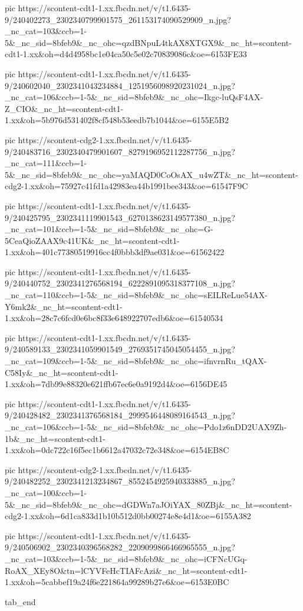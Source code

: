      pic https://scontent-cdt1-1.xx.fbcdn.net/v/t1.6435-9/240402273_2302340799901575_261153174090529909_n.jpg?_nc_cat=103&ccb=1-5&_nc_sid=8bfeb9&_nc_ohc=qzdBNpuL4tkAX8XTGX9&_nc_ht=scontent-cdt1-1.xx&oh=d4d4958bc1e04ca50c5e02c70839086c&oe=6153FE33

     pic https://scontent-cdt1-1.xx.fbcdn.net/v/t1.6435-9/240602040_2302341043234884_1251956098920231024_n.jpg?_nc_cat=106&ccb=1-5&_nc_sid=8bfeb9&_nc_ohc=Ikgc-luQsF4AX-Z_CIO&_nc_ht=scontent-cdt1-1.xx&oh=5b976d531402f8cf548b53eedb7b1044&oe=6155E5B2

     pic https://scontent-cdg2-1.xx.fbcdn.net/v/t1.6435-9/240483716_2302340479901607_8279196952112287756_n.jpg?_nc_cat=111&ccb=1-5&_nc_sid=8bfeb9&_nc_ohc=yaMAQD0CoOsAX_u4wZT&_nc_ht=scontent-cdg2-1.xx&oh=75927c41fd1a42983ea44b1991bee343&oe=61547F9C

     pic https://scontent-cdt1-1.xx.fbcdn.net/v/t1.6435-9/240425795_2302341119901543_6270138623149577380_n.jpg?_nc_cat=101&ccb=1-5&_nc_sid=8bfeb9&_nc_ohc=G-5CeaQioZAAX9c41UK&_nc_ht=scontent-cdt1-1.xx&oh=401c77380519916cc4f0bbb3df9ae031&oe=61562422

     pic https://scontent-cdt1-1.xx.fbcdn.net/v/t1.6435-9/240440752_2302341276568194_6222891095318377108_n.jpg?_nc_cat=110&ccb=1-5&_nc_sid=8bfeb9&_nc_ohc=sEILReLue54AX-Y6mk2&_nc_ht=scontent-cdt1-1.xx&oh=28c7c6fcd0e6bc8f33e648922707edb6&oe=61540534

     pic https://scontent-cdt1-1.xx.fbcdn.net/v/t1.6435-9/240589133_2302341059901549_2769351745045054455_n.jpg?_nc_cat=109&ccb=1-5&_nc_sid=8bfeb9&_nc_ohc=ifnvrnRu_tQAX-C58Iy&_nc_ht=scontent-cdt1-1.xx&oh=7db99e88320e621ffb67ec6e0a9192d4&oe=6156DE45

     pic https://scontent-cdt1-1.xx.fbcdn.net/v/t1.6435-9/240428482_2302341376568184_2999546448089164543_n.jpg?_nc_cat=106&ccb=1-5&_nc_sid=8bfeb9&_nc_ohc=Pdo1z6nDD2UAX9Zh-1b&_nc_ht=scontent-cdt1-1.xx&oh=0dc722c16f5ec1b6612a47032c72e348&oe=6154EB8C

     pic https://scontent-cdg2-1.xx.fbcdn.net/v/t1.6435-9/240482252_2302341213234867_8552454925940333885_n.jpg?_nc_cat=100&ccb=1-5&_nc_sid=8bfeb9&_nc_ohc=dGDWn7aJOiYAX_80ZBj&_nc_ht=scontent-cdg2-1.xx&oh=6d1ca833d1b10b512d0bb00274e8e4d1&oe=6155A382

     pic https://scontent-cdt1-1.xx.fbcdn.net/v/t1.6435-9/240506902_2302340396568282_2209099866466965555_n.jpg?_nc_cat=103&ccb=1-5&_nc_sid=8bfeb9&_nc_ohc=iCFNcUGq-RoAX_XEy8O&tn=lCYVFeHcTIAFcAzi&_nc_ht=scontent-cdt1-1.xx&oh=5cabbef19a24f6e221864a99289b27e6&oe=6153E0BC

  tab_end
\fi

